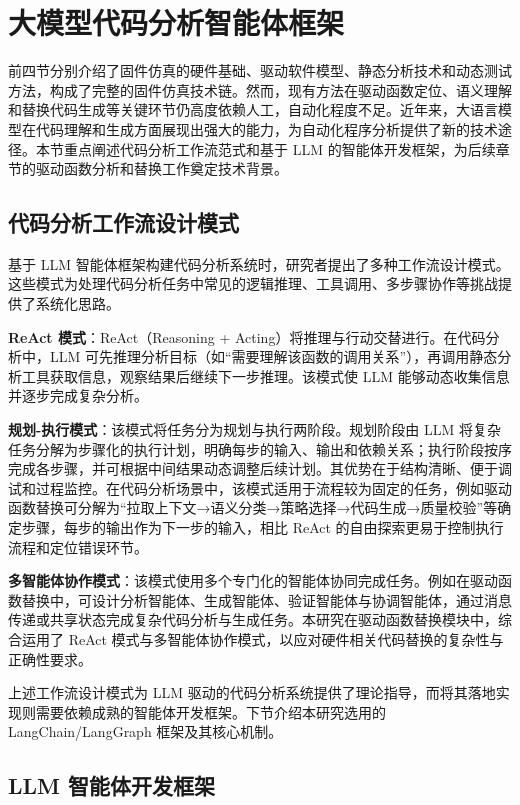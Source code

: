\section{大模型代码分析智能体框架}
\label{sec:llm}

前四节分别介绍了固件仿真的硬件基础、驱动软件模型、静态分析技术和动态测试方法，构成了完整的固件仿真技术链。然而，现有方法在驱动函数定位、语义理解和替换代码生成等关键环节仍高度依赖人工，自动化程度不足。近年来，大语言模型在代码理解和生成方面展现出强大的能力，为自动化程序分析提供了新的技术途径。本节重点阐述代码分析工作流范式和基于 LLM 的智能体开发框架，为后续章节的驱动函数分析和替换工作奠定技术背景。

\subsection{代码分析工作流设计模式}
\label{sec:workflow_paradigm}

基于 LLM 智能体框架构建代码分析系统时，研究者提出了多种工作流设计模式。这些模式为处理代码分析任务中常见的逻辑推理、工具调用、多步骤协作等挑战提供了系统化思路。

\textbf{ReAct 模式}：ReAct（Reasoning + Acting）将推理与行动交替进行\cite{Yao_2022}。在代码分析中，LLM 可先推理分析目标（如“需要理解该函数的调用关系”），再调用静态分析工具获取信息，观察结果后继续下一步推理。该模式使 LLM 能够动态收集信息并逐步完成复杂分析。

\textbf{规划-执行模式}：该模式将任务分为规划与执行两阶段\cite{wang2023plan}。规划阶段由 LLM 将复杂任务分解为步骤化的执行计划，明确每步的输入、输出和依赖关系；执行阶段按序完成各步骤，并可根据中间结果动态调整后续计划。其优势在于结构清晰、便于调试和过程监控。在代码分析场景中，该模式适用于流程较为固定的任务，例如驱动函数替换可分解为“拉取上下文→语义分类→策略选择→代码生成→质量校验”等确定步骤，每步的输出作为下一步的输入，相比 ReAct 的自由探索更易于控制执行流程和定位错误环节。

\textbf{多智能体协作模式}：该模式使用多个专门化的智能体协同完成任务\cite{dong2024selfcollaboration}。例如在驱动函数替换中，可设计分析智能体、生成智能体、验证智能体与协调智能体，通过消息传递或共享状态完成复杂代码分析与生成任务。本研究在驱动函数替换模块中，综合运用了 ReAct 模式与多智能体协作模式，以应对硬件相关代码替换的复杂性与正确性要求。

上述工作流设计模式为 LLM 驱动的代码分析系统提供了理论指导，而将其落地实现则需要依赖成熟的智能体开发框架。下节介绍本研究选用的 LangChain/LangGraph 框架及其核心机制。

\subsection{LLM 智能体开发框架}
\label{sec:llm_framework}

